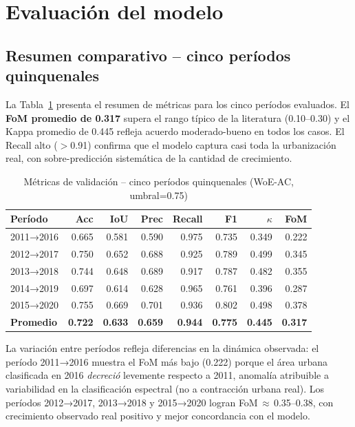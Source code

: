 \section{Evaluación del modelo}

\subsection{Resumen comparativo -- cinco períodos quinquenales}

La Tabla~\ref{tab:metrics_all_periods} presenta el resumen de métricas para los cinco períodos evaluados. El \textbf{FoM promedio de 0.317} supera el rango típico de la literatura (0.10--0.30) y el Kappa promedio de 0.445 refleja acuerdo moderado-bueno en todos los casos. El Recall alto ($>$0.91) confirma que el modelo captura casi toda la urbanización real, con sobre-predicción sistemática de la cantidad de crecimiento.

\begin{table}[htbp]
\centering
\caption{Métricas de validación -- cinco períodos quinquenales (WoE-AC, umbral=0.75)}
\label{tab:metrics_all_periods}
\small
\begin{tabular}{lrrrrrrr}
\toprule
\textbf{Período} & \textbf{Acc} & \textbf{IoU} & \textbf{Prec} & \textbf{Recall} & \textbf{F1} & \textbf{$\kappa$} & \textbf{FoM} \\
\midrule
2011→2016 & 0.665 & 0.581 & 0.590 & 0.975 & 0.735 & 0.349 & 0.222 \\
2012→2017 & 0.750 & 0.652 & 0.688 & 0.925 & 0.789 & 0.499 & 0.345 \\
2013→2018 & 0.744 & 0.648 & 0.689 & 0.917 & 0.787 & 0.482 & 0.355 \\
2014→2019 & 0.697 & 0.614 & 0.628 & 0.965 & 0.761 & 0.396 & 0.287 \\
2015→2020 & 0.755 & 0.669 & 0.701 & 0.936 & 0.802 & 0.498 & 0.378 \\
\midrule
\textbf{Promedio} & \textbf{0.722} & \textbf{0.633} & \textbf{0.659} & \textbf{0.944} & \textbf{0.775} & \textbf{0.445} & \textbf{0.317} \\
\bottomrule
\end{tabular}
\end{table}

La variación entre períodos refleja diferencias en la dinámica observada: el período 2011→2016 muestra el FoM más bajo (0.222) porque el área urbana clasificada en 2016 \textit{decreció} levemente respecto a 2011, anomalía atribuible a variabilidad en la clasificación espectral (no a contracción urbana real). Los períodos 2012→2017, 2013→2018 y 2015→2020 logran FoM$\,\approx\,$0.35--0.38, con crecimiento observado real positivo y mejor concordancia con el modelo.

